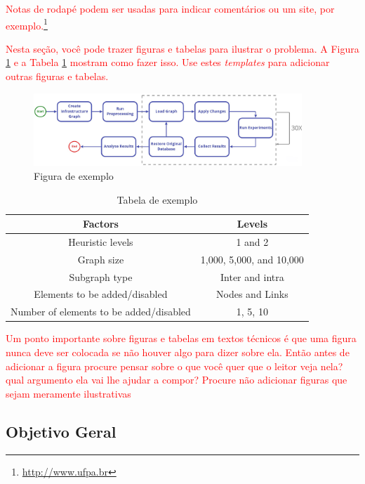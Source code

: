 \textcolor{red}{Notas de rodapé podem ser usadas para indicar comentários ou um site, por exemplo.\footnote{\url{http://www.ufpa.br}}}

\textcolor{red}{Nesta seção, você pode trazer figuras e tabelas para ilustrar o problema. A Figura \ref{fig:exemplo} e a Tabela \ref{tab:exemplo} mostram como fazer isso. Use estes \textit{templates} para adicionar outras figuras e tabelas.}

\begin{figure}[ht]
\centering
\includegraphics[width=0.9\textwidth]{figures/methodology.jpg}
\caption{Figura de exemplo}
\label{fig:exemplo}
\end{figure}


\begin{table}[ht]
\centering
\caption{Tabela de exemplo}
\label{tab:exemplo}
\begin{tabular}{@{}cc@{}}
\toprule
\textbf{Factors}                       & \textbf{Levels}          \\ \midrule
Heuristic levels                       & 1 and 2                  \\
Graph size                             & 1,000, 5,000, and 10,000 \\
Subgraph type                          & Inter and intra          \\
Elements to be added/disabled           & Nodes and Links          \\
Number of elements to be added/disabled & 1, 5, 10                \\ \bottomrule
\end{tabular}
\end{table}

\textcolor{red}{Um ponto importante sobre figuras e tabelas em textos técnicos é que uma figura nunca deve ser colocada se não houver algo para dizer sobre ela. Então antes de adicionar a figura procure pensar sobre o que você quer que o leitor veja nela? qual argumento ela vai lhe ajudar a compor? Procure não adicionar figuras que sejam meramente ilustrativas}

\subsection{Objetivo Geral}

